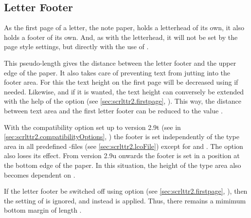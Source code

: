 \subsection{Letter Footer}
\label{sec:scrlttr2-experts.firstFoot}%
%


As the first page of a letter, the note paper, holds a letterhead of its own,
it also holds a footer of
its own. And, as with the letterhead, it will not be set by the page style
settings, but directly with the use of
.

\begin{Declaration}
\end{Declaration}
%
This pseudo-length gives the distance between the letter footer and the upper
edge of the paper. It also takes care of preventing text from jutting into the
footer area. For this the text height on the first page will be decreased
using %
 if needed.  Likewise, and if it is wanted,
the text height can conversely be extended with the help of the option
 (see
\autoref{sec:scrlttr2.firstpage},
). This way, the distance
between text area and the first letter footer can be reduced to the value
.

With the compatibility option
set up to version
2.9t (see  in
\autoref{sec:scrlttr2.compatibilityOptions},
) the footer is set independently of
the type area in all predefined
-files
(see \autoref{sec:scrlttr2.lcoFile}) except for  and
. The option
 also loses its
effect. From version 2.9u onwards the
footer is set in a position at the bottom edge of the paper. In this
situation, the height of the type area also becomes dependent on
.

If the letter footer be switched off using option
%
(see \autoref{sec:scrlttr2.firstpage},
), then the setting of
 is ignored, and instead
 is applied.  Thus, there remains
a mimimum bottom margin of length .%
%
%


